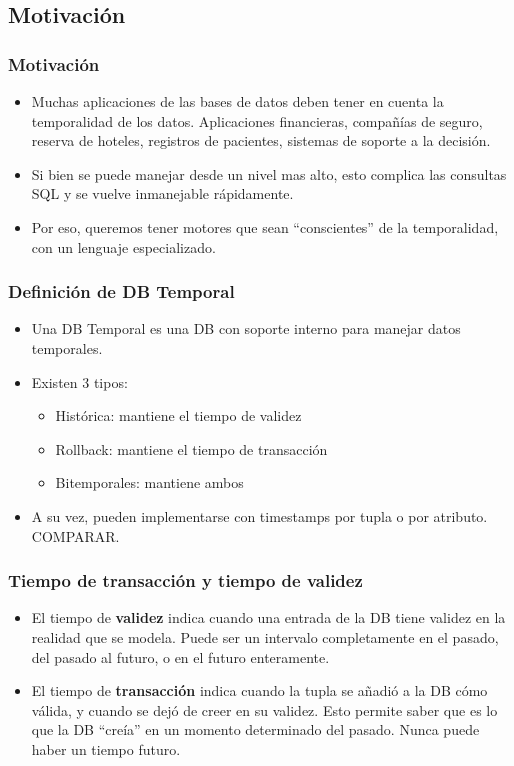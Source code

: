 \subsection{Motivación}

\begin{frame}
	\frametitle{Motivación}
	\begin{itemize}
	\item	Muchas aplicaciones de las bases de datos deben tener
		en cuenta la temporalidad de los datos. \pause
		Aplicaciones financieras, compañías de seguro, reserva
		de hoteles, registros de pacientes, sistemas de soporte
		a la decisión. \pause

	\item	Si bien se puede manejar desde un nivel mas alto, esto
		complica las consultas SQL y se vuelve inmanejable rápidamente.
		\pause

	\item	Por eso, queremos tener motores que sean ``conscientes'' de
		la temporalidad, con un lenguaje especializado.
	\end{itemize}
\end{frame}

\begin{frame}
\frametitle{Definición de DB Temporal}
	\begin{itemize}
	\item	Una DB Temporal es una DB con soporte interno para manejar
		datos temporales. \pause

	\item	Existen 3 tipos: \pause
		\begin{itemize}
		\item Histórica: mantiene el tiempo de validez \pause
		\item Rollback: mantiene el tiempo de transacción \pause
		\item Bitemporales: mantiene ambos \pause
		\end{itemize}

	\item	A su vez, pueden implementarse con timestamps por tupla
		o por atributo. COMPARAR.
	\end{itemize}
\end{frame}

\begin{frame}
\frametitle{Tiempo de transacción y tiempo de validez}
	\begin{itemize}
	\item	El tiempo de {\bf validez} indica cuando una entrada de la DB
		tiene validez en la realidad que se modela. \pause Puede
		ser un intervalo completamente en el pasado, del pasado al
		futuro, o en el futuro enteramente.
	\pause
	\item	El tiempo de {\bf transacción} indica cuando la tupla se añadió
		a la DB cómo válida, y cuando se dejó de creer en su validez.
		\pause Esto permite saber que es lo que la DB ``creía'' en
		un momento determinado del pasado.
		\pause Nunca puede haber un tiempo futuro.
	\end{itemize}
\end{frame}

